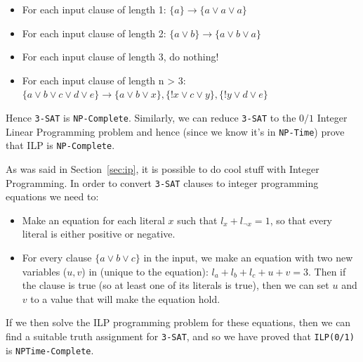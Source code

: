 \begin{itemize}
  \item For each input clause of length 1:
    $\{a\} \rightarrow \{a \vee a \vee a\}$ 
  \item For each input clause of length 2:
    $\{a \vee b\} \rightarrow \{a \vee b \vee a\}$ 
  \item For each input clause of length 3, do nothing!
  \item For each input clause of length n > 3:
    $\{a \vee b \vee c \vee d \vee e\} \rightarrow
      \{a \vee b \vee x\},
      \{!x \vee c \vee y\},
      \{!y \vee d \vee e\}$ 
\end{itemize}

Hence \texttt{3-SAT} is \texttt{NP-Complete}. Similarly, we can reduce
\texttt{3-SAT} to the $0/1$ Integer Linear Programming problem and hence (since
we know it's in \texttt{NP-Time}) prove that ILP is \texttt{NP-Complete}.

As was said in Section~\ref{sec:ip}, it is possible to do cool stuff with
Integer Programming. In order to convert \texttt{3-SAT} clauses to integer
programming equations we need to:

\begin{itemize}
  \item Make an equation for each literal $x$ such that $l_x + l_{\neg x} = 1$,
  so that every literal is either positive or negative.

  \item For every clause $\{a \vee b \vee c\}$ in the input, we make an 
  equation with two new variables ($u,v$) in (unique to the equation):
  $l_a + l_b + l_c + u + v = 3$. Then if the clause is true (so at least one of 
  its literals is true), then we can set $u$ and $v$ to a value that will make 
  the equation hold.
\end{itemize}


If we then solve the ILP programming problem for these equations, then we can
find a suitable truth assignment for \texttt{3-SAT}, and so we have proved that
\texttt{ILP(0/1)} is \texttt{NPTime-Complete}.

